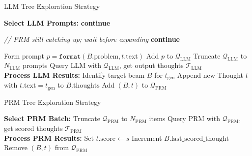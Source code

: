 \documentclass[11pt,twoside]{report}
\begin{document}
\begin{algorithm}[H]\label{alg:llmtreesearch}
\caption{LLM Tree Exploration Strategy}
\begin{algorithmic}[1]
\Statex \textbf{Select LLM Prompts:}
        \State \textbf{continue}
    \EndIf

        \State \textit{// PRM still catching up; wait before expanding}
        \State \textbf{continue}
    \EndIf

            \State Form prompt $p = \texttt{format}(B.\text{problem}, t.\text{text})$
            \State Add $p$ to $\mathcal{Q}_{\text{LLM}}$
        \EndFor
    \EndIf
\EndFor
\State Truncate $\mathcal{Q}_{\text{LLM}}$ to $N_{\text{LLM}}$ prompts
\State Query LLM with $\mathcal{Q}_{\text{LLM}}$, get output thoughts $\mathcal{T}_{\text{LLM}}$ \\

\Statex \textbf{Process LLM Results:}
    \State Identify target beam $B$ for $t_{\text{gen}}$
    \State Append new Thought $t$ with $t.\text{text} = t_{\text{gen}}$ to $B.\text{thoughts}$
    \State Add $(B, t)$ to $\mathcal{Q}_{\text{PRM}}$
\EndFor
\end{algorithmic}
\end{algorithm}

\begin{algorithm}[H]\label{alg:prmtreesearch}
\caption{PRM Tree Exploration Strategy}
\begin{algorithmic}[1]
    \Statex \textbf{Select PRM Batch:}
    \State Truncate $\mathcal{Q}_{\text{PRM}}$ to $N_{\text{PRM}}$ items
    \State Query PRM with $\mathcal{Q}_{\text{PRM}}$, get scored thoughts $\mathcal{T}_{\text{PRM}}$ \\
    \Statex \textbf{Process PRM Results:}
        \State Set $t.\text{score} \gets s$
        \State Increment $B.\text{last\_scored\_thought}$
        \State Remove $(B, t)$ from $\mathcal{Q}_{\text{PRM}}$
    \EndFor
\end{algorithmic}
\end{algorithm}
\end{document}

